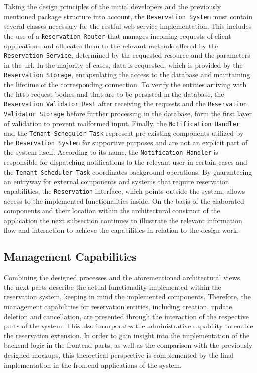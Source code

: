 \noindent Taking the design principles of the initial developers and the previously mentioned package structure into account, the \texttt{Reservation System} must contain several classes necessary for the \acrshort{rest}ful web service implementation.
This includes the use of a \texttt{Reservation Router} that manages incoming requests of client applications and allocates them to the relevant methods offered by the \texttt{Reservation Service}, determined by the requested resource and the parameters in the \acrshort{url}.
In the majority of cases, data is requested, which is provided by the \texttt{Reservation Storage}, encapsulating the access to the database and maintaining the lifetime of the corresponding connection.
To verify the entities arriving with the \acrshort{http} request bodies and that are to be persisted in the database, the \texttt{Reservation Validator Rest} after receiving the requests and the \texttt{Reservation Validator Storage} before further processing in the database, form the first layer of validation to prevent malformed input.
Finally, the \texttt{Notification Handler} and the \texttt{Tenant Scheduler Task} represent pre-existing components utilized by the \texttt{Reservation System} for supportive purposes and are not an explicit part of the system itself.
According to its name, the \texttt{Notification Handler} is responsible for dispatching notifications to the relevant user in certain cases and the \texttt{Tenant Scheduler Task} coordinates background operations. 
By guaranteeing an entryway for external components and systems that require reservation capabilities, the \texttt{Reservation} interface, which points outside the system, allows access to the implemented functionalities inside.
On the basis of the elaborated components and their location within the architectural construct of the application the next subsection continues to illustrate the relevant information flow and interaction to achieve the capabilities in relation to the design work.

\subsection{Management Capabilities}
\label{ch:Implementation:sec:Reservation System:ssec:Management Capabilities}

Combining the designed processes and the aforementioned architectural views, the next parts describe the actual functionality implemented within the reservation system, keeping in mind the implemented components.
Therefore, the management capabilities for reservation entities, including creation, update, deletion and cancellation, are presented through the interaction of the respective parts of the system. This also incorporates the administrative capability to enable the reservation extension. 
In order to gain insight into the implementation of the backend logic in the frontend parts, as well as the comparison with the previously designed mockups, this theoretical perspective is complemented by the final implementation in the frontend applications of the system.

